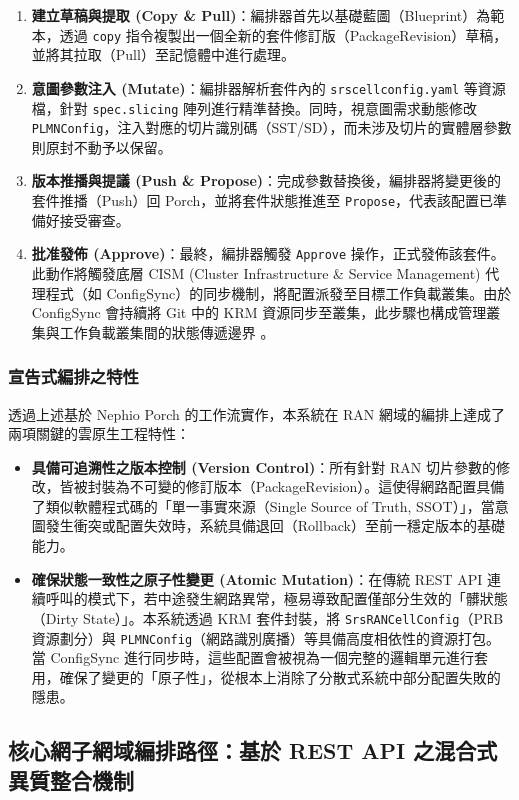 \begin{enumerate}
    \item \textbf{建立草稿與提取 (Copy \& Pull)}：編排器首先以基礎藍圖（Blueprint）為範本，透過 \texttt{copy} 指令複製出一個全新的套件修訂版（PackageRevision）草稿，並將其拉取（Pull）至記憶體中進行處理。
    \item \textbf{意圖參數注入 (Mutate)}：編排器解析套件內的 \texttt{srscellconfig.yaml} 等資源檔，針對 \texttt{spec.slicing} 陣列進行精準替換。同時，視意圖需求動態修改 \texttt{PLMNConfig}，注入對應的切片識別碼（SST/SD），而未涉及切片的實體層參數則原封不動予以保留。
    \item \textbf{版本推播與提議 (Push \& Propose)}：完成參數替換後，編排器將變更後的套件推播（Push）回 Porch，並將套件狀態推進至 \texttt{Propose}，代表該配置已準備好接受審查。
    \item \textbf{批准發佈 (Approve)}：最終，編排器觸發 \texttt{Approve} 操作，正式發佈該套件。此動作將觸發底層 CISM (Cluster Infrastructure \& Service Management) 代理程式（如 ConfigSync）的同步機制，將配置派發至目標工作負載叢集。由於 ConfigSync 會持續將 Git 中的 KRM 資源同步至叢集，此步驟也構成管理叢集與工作負載叢集間的狀態傳遞邊界 \cite{google_config_sync}。
\end{enumerate}

\subsubsection{宣告式編排之特性}
透過上述基於 Nephio Porch 的工作流實作，本系統在 RAN 網域的編排上達成了兩項關鍵的雲原生工程特性：
\begin{itemize}
    \item \textbf{具備可追溯性之版本控制 (Version Control)}：所有針對 RAN 切片參數的修改，皆被封裝為不可變的修訂版本（PackageRevision）。這使得網路配置具備了類似軟體程式碼的「單一事實來源（Single Source of Truth, SSOT）」，當意圖發生衝突或配置失效時，系統具備退回（Rollback）至前一穩定版本的基礎能力。
    \item \textbf{確保狀態一致性之原子性變更 (Atomic Mutation)}：在傳統 REST API 連續呼叫的模式下，若中途發生網路異常，極易導致配置僅部分生效的「髒狀態（Dirty State）」。本系統透過 KRM 套件封裝，將 \texttt{SrsRANCellConfig}（PRB 資源劃分）與 \texttt{PLMNConfig}（網路識別廣播）等具備高度相依性的資源打包。當 ConfigSync 進行同步時，這些配置會被視為一個完整的邏輯單元進行套用，確保了變更的「原子性」，從根本上消除了分散式系統中部分配置失敗的隱患。
\end{itemize}

\subsection{核心網子網域編排路徑：基於 REST API 之混合式異質整合機制}
\label{subsec:core_orchestration_path}

